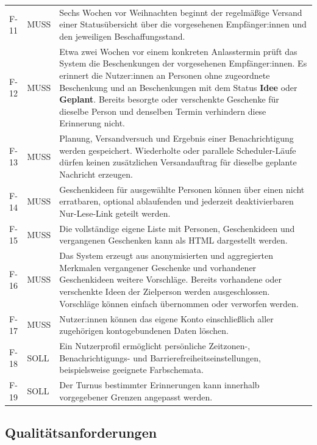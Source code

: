 \documentclass[11pt,a4paper]{article}
\begin{document}
\begin{tabularx}{\linewidth}{@{}l l Y@{}}
F-11 & MUSS & Sechs Wochen vor Weihnachten beginnt der regelmäßige Versand einer Statusübersicht über die vorgesehenen Empfänger:innen und den jeweiligen Beschaffungsstand. \\
F-12 & MUSS & Etwa zwei Wochen vor einem konkreten Anlasstermin prüft das System die Beschenkungen der vorgesehenen Empfänger:innen. Es erinnert die Nutzer:innen an Personen ohne zugeordnete Beschenkung und an Beschenkungen mit dem Status \textbf{Idee} oder \textbf{Geplant}. Bereits besorgte oder verschenkte Geschenke für dieselbe Person und denselben Termin verhindern diese Erinnerung nicht. \\
F-13 & MUSS & Planung, Versandversuch und Ergebnis einer Benachrichtigung werden gespeichert. Wiederholte oder parallele Scheduler-Läufe dürfen keinen zusätzlichen Versandauftrag für dieselbe geplante Nachricht erzeugen. \\
F-14 & MUSS & Geschenkideen für ausgewählte Personen können über einen nicht erratbaren, optional ablaufenden und jederzeit deaktivierbaren Nur-Lese-Link geteilt werden. \\
F-15 & MUSS & Die vollständige eigene Liste mit Personen, Geschenkideen und vergangenen Geschenken kann als HTML dargestellt werden. \\
F-16 & MUSS & Das System erzeugt aus anonymisierten und aggregierten Merkmalen vergangener Geschenke und vorhandener Geschenkideen weitere Vorschläge. Bereits vorhandene oder verschenkte Ideen der Zielperson werden ausgeschlossen. Vorschläge können einfach übernommen oder verworfen werden. \\
F-17 & MUSS & Nutzer:innen können das eigene Konto einschließlich aller zugehörigen kontogebundenen Daten löschen. \\
F-18 & SOLL & Ein Nutzerprofil ermöglicht persönliche Zeitzonen-, Benachrichtigungs- und Barrierefreiheitseinstellungen, beispielsweise geeignete Farbschemata. \\
F-19 & SOLL & Der Turnus bestimmter Erinnerungen kann innerhalb vorgegebener Grenzen angepasst werden. \\
\bottomrule
\end{tabularx}

\subsection{Qualitätsanforderungen}
\end{document}
